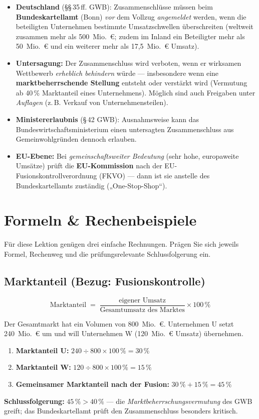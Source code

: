 \documentclass[11pt, a4paper]{article}
\begin{document}
\begin{itemize}
  \item \textbf{Deutschland} (\S\S\,35\,ff. GWB): Zusammenschlüsse müssen beim
    \textbf{Bundeskartellamt} (Bonn) \emph{vor} dem Vollzug \emph{angemeldet} werden,
    wenn die beteiligten Unternehmen bestimmte Umsatzschwellen überschreiten (weltweit
    zusammen mehr als 500~Mio.~€; zudem im Inland ein Beteiligter mehr als 50~Mio.~€
    und ein weiterer mehr als 17,5~Mio.~€ Umsatz).
  \item \textbf{Untersagung:} Der Zusammenschluss wird verboten, wenn er wirksamen
    Wettbewerb \emph{erheblich behindern} würde --- insbesondere wenn eine
    \textbf{marktbeherrschende Stellung} entsteht oder verstärkt wird (Vermutung ab
    40\,\% Marktanteil eines Unternehmens). Möglich sind auch Freigaben unter
    \emph{Auflagen} (z.\,B. Verkauf von Unternehmensteilen).
  \item \textbf{Ministererlaubnis} (\S\,42 GWB): Ausnahmsweise kann das
    Bundeswirtschaftsministerium einen untersagten Zusammenschluss aus
    Gemeinwohlgründen dennoch erlauben.
  \item \textbf{EU-Ebene:} Bei \emph{gemeinschaftsweiter Bedeutung} (sehr hohe,
    europaweite Umsätze) prüft die \textbf{EU-Kommission} nach der
    EU-Fusionskontrollverordnung (FKVO) --- dann ist sie anstelle des Bundeskartellamts
    zuständig („One-Stop-Shop``).
\end{itemize}

\section{Formeln \& Rechenbeispiele}

Für diese Lektion genügen drei einfache Rechnungen. Prägen Sie sich jeweils Formel,
Rechenweg und die prüfungsrelevante Schlussfolgerung ein.

\subsection{Marktanteil (Bezug: Fusionskontrolle)}

\[
\textrm{Marktanteil} \;=\; \frac{\textrm{eigener Umsatz}}{\textrm{Gesamtumsatz des Marktes}} \times 100\,\%
\]

\begin{beispiel}[title={Rechenbeispiel: Marktanteile bei einer geplanten Fusion}]
Der Gesamtmarkt hat ein Volumen von 800~Mio.~€. Unternehmen U setzt 240~Mio.~€ um und
will Unternehmen W (120~Mio.~€ Umsatz) übernehmen.
\begin{enumerate}
  \item \textbf{Marktanteil U:} $240 \div 800 \times 100\,\% = 30\,\%$
  \item \textbf{Marktanteil W:} $120 \div 800 \times 100\,\% = 15\,\%$
  \item \textbf{Gemeinsamer Marktanteil nach der Fusion:} $30\,\% + 15\,\% = 45\,\%$
\end{enumerate}
\textbf{Schlussfolgerung:} $45\,\% > 40\,\%$ --- die
\emph{Marktbeherrschungsvermutung} des GWB greift; das Bundeskartellamt prüft den
Zusammenschluss besonders kritisch.
\end{beispiel}
\end{document}
